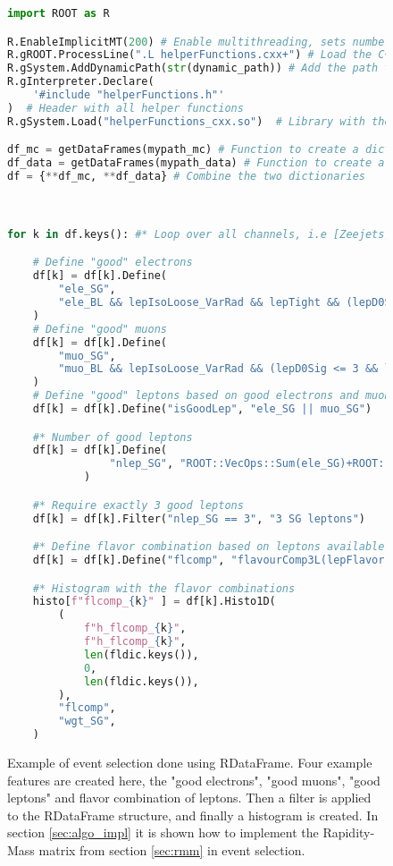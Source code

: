 \begin{figure}[h!]
    \centering
\begin{lstlisting}[language=Python, style=pythonstyle, label={code:python_func_example}]
import ROOT as R

R.EnableImplicitMT(200) # Enable multithreading, sets number of threads to 200 or the highest number possible if the number of threads is less than 200     
R.gROOT.ProcessLine(".L helperFunctions.cxx+") # Load the C++ helper functions in ROOT interpreter
R.gSystem.AddDynamicPath(str(dynamic_path)) # Add the path to the library with the helper functions to the ROOT interpreter
R.gInterpreter.Declare(
    '#include "helperFunctions.h"'
)  # Header with all helper functions
R.gSystem.Load("helperFunctions_cxx.so")  # Library with the myFilter function

df_mc = getDataFrames(mypath_mc) # Function to create a dictionary of RDataFrames for each channel in the SM MC and possible signal samples
df_data = getDataFrames(mypath_data) # Function to create a dictionary of RDataFrames for ATLAS data
df = {**df_mc, **df_data} # Combine the two dictionaries



for k in df.keys(): #* Loop over all channels, i.e [Zeejets, ttbar, data15, ...]

    # Define "good" electrons
    df[k] = df[k].Define(
        "ele_SG",
        "ele_BL && lepIsoLoose_VarRad && lepTight && (lepD0Sig <= 5 && lepD0Sig >= -5)",
    ) 
    # Define "good" muons 
    df[k] = df[k].Define(
        "muo_SG",
        "muo_BL && lepIsoLoose_VarRad && (lepD0Sig <= 3 && lepD0Sig >= -3)",
    )  
    # Define "good" leptons based on good electrons and muons
    df[k] = df[k].Define("isGoodLep", "ele_SG || muo_SG")

    #* Number of good leptons
    df[k] = df[k].Define(
                "nlep_SG", "ROOT::VecOps::Sum(ele_SG)+ROOT::VecOps::Sum(muo_SG)"
            )

    #* Require exactly 3 good leptons
    df[k] = df[k].Filter("nlep_SG == 3", "3 SG leptons")

    #* Define flavor combination based on leptons available
    df[k] = df[k].Define("flcomp", "flavourComp3L(lepFlavor[ele_SG || muo_SG])")

    #* Histogram with the flavor combinations
    histo[f"flcomp_{k}" ] = df[k].Histo1D(
        (
            f"h_flcomp_{k}",
            f"h_flcomp_{k}",
            len(fldic.keys()),
            0,
            len(fldic.keys()),
        ),
        "flcomp",
        "wgt_SG",
    )
    \end{lstlisting}
    \caption[RDataFrame code example]{Example of event selection done using RDataFrame. Four example features are created here, the "good electrons", "good muons",
    "good leptons" and flavor combination of leptons. Then a filter is applied to the RDataFrame structure, and finally a histogram is created. In section \ref{sec:algo_impl}
    it is shown how to implement the Rapidity-Mass matrix from section \ref{sec:rmm} in event selection.}
    \label{code:rdata}
\end{figure}


